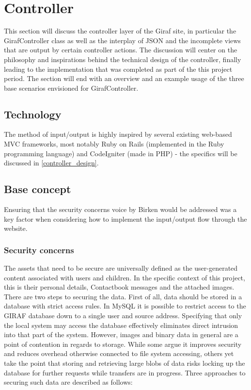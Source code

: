 \section{Controller}
\label{controller}
This section will discuss the controller layer of the Giraf site, in particular the GirafController class as well as the interplay of JSON and the incomplete views that are output by certain controller actions. The discussion will center on the philosophy and inspirations behind the technical design of the controller, finally leading to the implementation that was completed as part of the this project period. The section will end with an overview and an example usage of the three base scenarios envisioned for GirafController.

\subsection{Technology}
The method of input/output is highly inspired by several existing web-based MVC frameworks, most notably Ruby on Rails (implemented in the Ruby programming language) and CodeIgniter (made in PHP) - the specifics will be discussed in \vref{controller_design}.

\subsection{Base concept}
Ensuring that the security concerns voice by Birken  would be addressed was a key factor when considering how to implement the input/output flow through the website.

\subsubsection*{Security concerns}
The assets that need to be secure are universally defined as the user-generated content associated with users and children. In the specific context of this project, this is their personal details, Contactbook messages and the attached images. There are two steps to securing the data. First of all, data should be stored in a database with strict access rules. In MySQL it is possible to restrict access to the GIRAF database down to a single user and source address. Specifying that only the local system may access the database effectively eliminates direct intrusion into that part of the system. However, images and binary data in general are a point of contention in regards to storage. While some argue it improves security and reduces overhead otherwise connected to file system accessing, others yet take the point that storing and retrieving large blobs of data risks locking up the database for further requests while transfers are in progress. Three approaches to securing such data are described as follows:

